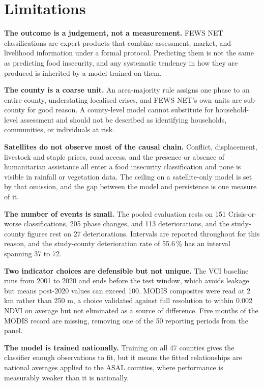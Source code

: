 \documentclass[11pt]{article}
\begin{document}
\section{Limitations}
\label{sec:limitations}

\textbf{The outcome is a judgement, not a measurement.} FEWS NET
classifications are expert products that combine assessment, market, and
livelihood information under a formal protocol. Predicting them is not the same
as predicting food insecurity, and any systematic tendency in how they are
produced is inherited by a model trained on them.

\textbf{The county is a coarse unit.} An area-majority rule assigns one phase to
an entire county, understating localised crises, and FEWS NET's own units are
sub-county for good reason. A county-level model cannot substitute for
household-level assessment and should not be described as identifying
households, communities, or individuals at risk.

\textbf{Satellites do not observe most of the causal chain.} Conflict,
displacement, livestock and staple prices, road access, and the presence or
absence of humanitarian assistance all enter a food insecurity classification and
none is visible in rainfall or vegetation data. The ceiling on a satellite-only
model is set by that omission, and the gap between the model and persistence is
one measure of it.

\textbf{The number of events is small.} The pooled evaluation rests on 151
Crisis-or-worse classifications, 205 phase changes, and 113 deteriorations, and
the study-county figures rest on 27 deteriorations. Intervals are reported
throughout for this reason, and the study-county deterioration rate of 55.6\,\%
has an interval spanning 37 to 72.

\textbf{Two indicator choices are defensible but not unique.} The VCI baseline
runs from 2001 to 2020 and ends before the test window, which avoids leakage but
means post-2020 values can exceed 100. MODIS composites were read at 2 km rather
than 250 m, a choice validated against full resolution to within 0.002 NDVI on
average but not eliminated as a source of difference. Five months of the MODIS
record are missing, removing one of the 50 reporting periods from the panel.

\textbf{The model is trained nationally.} Training on all 47 counties gives the
classifier enough observations to fit, but it means the fitted relationships are
national averages applied to the ASAL counties, where performance is measurably
weaker than it is nationally.
\end{document}
